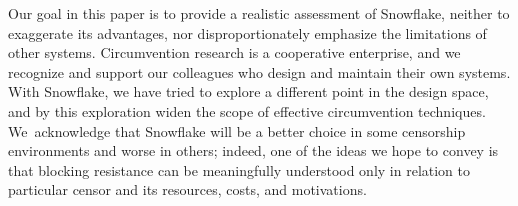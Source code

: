 \documentclass[letterpaper,twocolumn]{article}
\begin{document}

Our goal in this paper is to provide a realistic assessment of Snowflake,
neither to exaggerate its advantages,
nor disproportionately emphasize the limitations
of other systems.
Circumvention research is a cooperative enterprise,
and we recognize and support our colleagues who
design and maintain their own systems.
With Snowflake, we have tried to explore a different point in the design space,
and by this exploration widen the scope of effective circumvention techniques.
We~acknowledge that Snowflake will be a better choice in some
censorship environments and
worse in others; indeed,
one of the ideas we hope to convey
is that blocking resistance
can be meaningfully understood only in relation to particular censor
and its resources, costs, and motivations.
\end{document}
